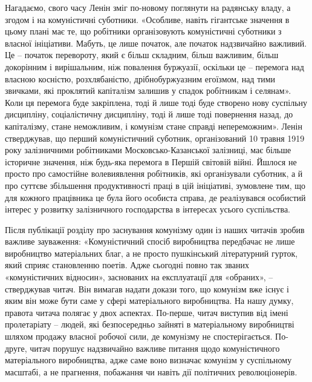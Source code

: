 \documentclass[12pt,a4paper,openany]{book}
\begin{document}
Нагадаємо, свого часу Ленін зміг по-новому поглянути на радянську владу, а згодом і на комуністичні суботники. «Особливе, навіть гігантське значення в цьому плані має те, що робітники організовують комуністичні суботники з власної ініціативи. Мабуть, це лише початок, але початок надзвичайно важливий. Це – початок перевороту, який є більш складним, більш важливим, більш докорінним і вирішальним, ніж повалення буржуазії, оскільки це – перемога над власною косністю, розхлябаністю, дрібнобуржуазним егоїзмом, над тими звичками, які проклятий капіталізм залишив у спадок робітникам і селянам». Коли ця перемога буде закріплена, тоді й лише тоді буде створено нову суспільну дисципліну, соціалістичну дисципліну, тоді й лише тоді повернення назад, до капіталізму, стане неможливим, і комунізм стане справді непереможним». Ленін стверджував, що перший комуністичний суботник, організований 10 травня 1919 року залізничними робітниками Московсько-Казанської залізниці, має більше історичне значення, ніж будь-яка перемога в Першій світовій війні. Йшлося не просто про самостійне волевиявлення робітників, які організували суботник, а й про суттєве збільшення продуктивності праці в цій ініціативі, зумовлене тим, що для кожного працівника це була його особиста справа, де реалізувався особистий інтерес у розвитку залізничного господарства в інтересах усього суспільства.

Після публікації розділу про заснування комунізму один із наших читачів зробив важливе зауваження: «Комуністичний спосіб виробництва передбачає не лише виробництво матеріальних благ, а не просто пушкінський літературний гурток, який сприяє становленню поетів. Адже сьогодні повно так званих «комуністичних відносин», заснованих на експлуатації для «обраних», – стверджував читач. Він вимагав надати докази того, що комунізм вже існує і яким він може бути саме у сфері матеріального виробництва. На нашу думку, правота читача полягає у двох аспектах. По-перше, читач виступив від імені пролетаріату – людей, які безпосередньо зайняті в матеріальному виробництві шляхом продажу власної робочої сили, де комунізму не спостерігається. По-друге, читач порушує надзвичайно важливе питання щодо комуністичного матеріального виробництва, адже саме воно визначає комунізм у суспільному масштабі, а не прагнення, побажання чи навіть дії політичних революціонерів.
\end{document}
